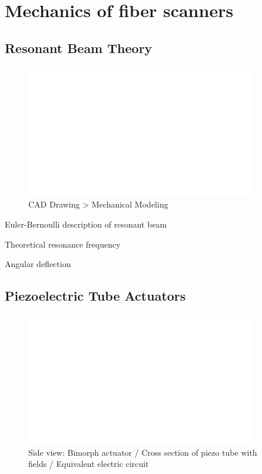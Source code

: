 \newpage
\section{Mechanics of fiber scanners}

\subsection{Resonant Beam Theory}
\begin{figure}[h!]
      \centering
      \includegraphics[width=10cm,draft]{figures/foo.png}
      \caption{CAD Drawing > Mechanical Modeling}
\end{figure}
Euler-Bernoulli description of resonant beam

Theoretical resonance frequency 

Angular deflection


\subsection{Piezoelectric Tube Actuators}



\begin{figure}[h!]
      \centering
      \includegraphics[width=10cm,draft]{figures/foo.png}
      \caption{Side view: Bimorph actuator / Cross section of piezo tube with fields / Equivalent electric circuit}
\end{figure}